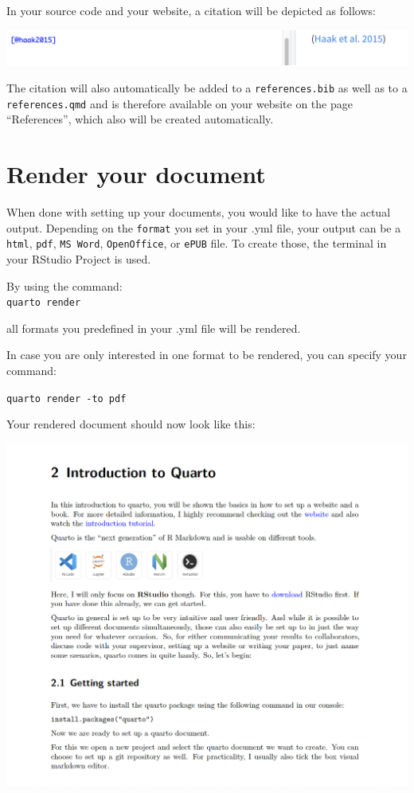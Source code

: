 \documentclass[
  letterpaper,
  DIV=11,
  numbers=noendperiod]{scrreprt}
\begin{document}
In your source code and your website, a citation will be depicted as
follows:

\includegraphics{img/quarto_intro/Screenshot 2023-10-11 at 15.12.57.png}

The citation will also automatically be added to a
\texttt{references.bib} as well as to a \texttt{references.qmd} and is
therefore available on your website on the page ``References'', which
also will be created automatically.

\hypertarget{render-your-document}{%
\section{Render your document}\label{render-your-document}}

When done with setting up your documents, you would like to have the
actual output. Depending on the \texttt{format} you set in your .yml
file, your output can be a \texttt{html}, \texttt{pdf},
\texttt{MS\ Word}, \texttt{OpenOffice}, or \texttt{ePUB} file. To create
those, the terminal in your RStudio Project is used.

By using the command:\\
\texttt{quarto\ render}

all formats you predefined in your .yml file will be rendered.

In case you are only interested in one format to be rendered, you can
specify your command:

\texttt{quarto\ render\ -to\ pdf}

Your rendered document should now look like this:

\includegraphics{img/quarto_intro/Screenshot 2023-10-17 at 14.15.05.png}
\end{document}
